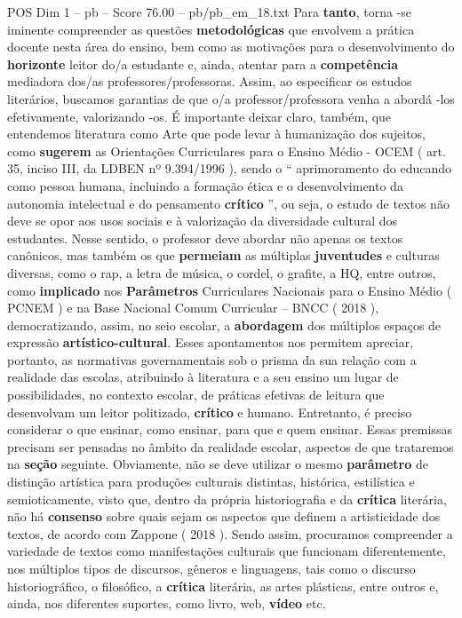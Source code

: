 \begin{textsample}{POS Dim 1 – pb – Score 76.00 – pb/pb\_em\_18.txt}
Para \textbf{tanto}, torna -se iminente compreender as questões \textbf{metodológicas} que envolvem a prática docente nesta área do ensino, bem como as motivações para o desenvolvimento do \textbf{horizonte} leitor do/a estudante e, ainda, atentar para a \textbf{competência} mediadora dos/as professores/professoras.
Assim, ao especificar os estudos literários, buscamos garantias de que o/a professor/professora venha a abordá -los efetivamente, valorizando -os.
É importante deixar claro, também, que entendemos literatura como Arte que pode levar à humanização dos sujeitos, como \textbf{sugerem} as Orientações Curriculares para o Ensino Médio - OCEM ( art. 35, inciso III, da LDBEN nº 9.394/1996 ), sendo o “ aprimoramento do educando como pessoa humana, incluindo a formação ética e o desenvolvimento da autonomia intelectual e do pensamento \textbf{crítico} ”, ou seja, o estudo de textos não deve se opor aos usos sociais e à valorização da diversidade cultural dos estudantes.
Nesse sentido, o professor deve abordar não apenas os textos canônicos, mas também os que \textbf{permeiam} as múltiplas \textbf{juventudes} e culturas diversas, como o rap, a letra de música, o cordel, o grafite, a HQ, entre outros, como \textbf{implicado} nos \textbf{Parâmetros} Curriculares Nacionais para o Ensino Médio ( PCNEM ) e na Base Nacional Comum Curricular – BNCC ( 2018 ), democratizando, assim, no seio escolar, a \textbf{abordagem} dos múltiplos espaços de expressão \textbf{artístico-cultural}.
Esses apontamentos nos permitem apreciar, portanto, as normativas governamentais sob o prisma da sua relação com a realidade das escolas, atribuindo à literatura e a seu ensino um lugar de possibilidades, no contexto escolar, de práticas efetivas de leitura que desenvolvam um leitor politizado, \textbf{crítico} e humano.
Entretanto, é preciso considerar o que ensinar, como ensinar, para que e quem ensinar.
Essas premissas precisam ser pensadas no âmbito da realidade escolar, aspectos de que trataremos na \textbf{seção} seguinte.
Obviamente, não se deve utilizar o mesmo \textbf{parâmetro} de distinção artística para produções culturais distintas, histórica, estilística e semioticamente, visto que, dentro da própria historiografia e da \textbf{crítica} literária, não há \textbf{consenso} sobre quais sejam os aspectos que definem a artisticidade dos textos, de acordo com Zappone ( 2018 ).
Sendo assim, procuramos compreender a variedade de textos como manifestações culturais que funcionam diferentemente, nos múltiplos tipos de discursos, gêneros e linguagens, tais como o discurso historiográfico, o filosófico, a \textbf{crítica} literária, as artes plásticas, entre outros e, ainda, nos diferentes suportes, como livro, web, \textbf{vídeo} etc.

\end{textsample}
